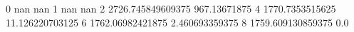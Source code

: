 0 nan nan
1 nan nan
2 2726.745849609375 967.13671875
4 1770.7353515625 11.126220703125
6 1762.06982421875 2.460693359375
8 1759.609130859375 0.0
